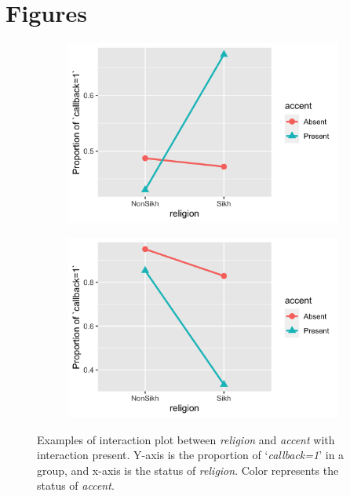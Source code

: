 \documentclass[11pt]{article}
\begin{document}
\clearpage
\appendix
{}

\section{Figures}
\setcounter{figure}{0} 
\begin{figure}[!h]
    \centering
    \begin{subfigure}{0.45\textwidth}
        \centering
        \includegraphics[width=\textwidth]{../../Plots/Interaction_accent_religion_negative.png}
    \end{subfigure}
    \begin{subfigure}{0.45\textwidth}
        \centering
        \includegraphics[width=\textwidth]{../../Plots/Interaction_accent_religion_positive.png}
    \end{subfigure}
    \caption{Examples of interaction plot between \textit{religion} and \textit{accent} with interaction present. Y-axis is the proportion of `\textit{callback=1}' in a group, and x-axis is the status of \textit{religion}. Color represents the status of \textit{accent}.}
    \label{fig:interact2}
\end{figure}

\clearpage
\begin{singlespace}
\raggedright
%

\end{singlespace}
\end{document}
